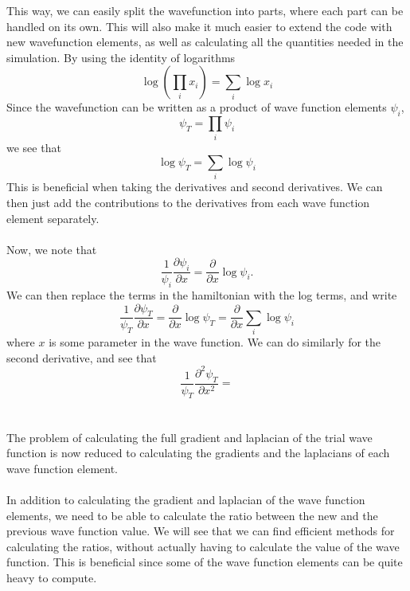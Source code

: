 This way, we can easily split the wavefunction into parts, where each part can be handled on its own. This will also make it much easier to extend the code with new wavefunction elements, as well as calculating all the quantities needed in the simulation. By using the identity of logarithms
\begin{equation}
    \log(\prod_i x_i) = \sum_i \log x_i
\end{equation}
Since the wavefunction can be written as a product of wave function elements $\psi_i$, 
\begin{equation}
    \psi_T = \prod_i \psi_i 
\end{equation}
we see that
\begin{equation}
    \log \psi_T = \sum_i \log \psi_i
\end{equation}
This is beneficial when taking the derivatives and second derivatives. We can then just add the contributions to the derivatives from each wave function element separately. 
\\
\\
Now, we note that 
\begin{equation}
    \frac{1}{\psi_i}\frac{\partial \psi_i}{\partial x} = \frac{\partial }{\partial x}\log\psi_i.
\end{equation}
We can then replace the terms in the hamiltonian with the log terms, and write
\begin{equation}
    \frac{1}{\psi_T}\frac{\partial \psi_T}{\partial x} = \frac{\partial}{\partial x}\log \psi_T = \frac{\partial}{\partial x}\sum_i \log \psi_i
\end{equation}
where $x$ is some parameter in the wave function. We can do similarly for the second derivative, and see that
\begin{equation}
    \frac{1}{\psi_T}\frac{\partial^2 \psi_T}{\partial x^2} = 
\end{equation}
\\
\\
The problem of calculating the full gradient and laplacian of the trial wave function is now reduced to calculating the gradients and the laplacians of each wave function element.
\\
\\
In addition to calculating the gradient and laplacian of the wave function elements, we need to be able to calculate the ratio between the new and the previous wave function value. We will see that we can find efficient methods for calculating the ratios, without actually having to calculate the value of the wave function. This is beneficial since some of the wave function elements can be quite heavy to compute. 
